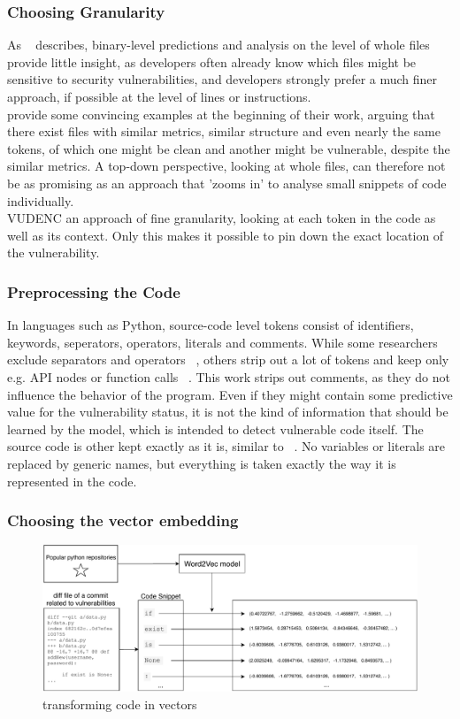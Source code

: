 \documentclass[
	a4paper,
	pagesize,
	pdftex,
	12pt,
	twoside, %
	BCOR=5mm, %
	ngerman,
	fleqn,
	final,
	]{scrartcl}
\begin{document}
\subsubsection{Choosing Granularity}
As ~\cite{Morrison.2015} describes, binary-level predictions and analysis on the level of whole files provide little insight, as developers often already know which files might be sensitive to security vulnerabilities, and developers strongly prefer a much finer approach, if possible at the level of lines or instructions.\\
\cite{Dam.2017} provide some convincing examples at the beginning of their work, arguing that there exist files with similar metrics, similar structure and even nearly the same tokens, of which one might be clean and another might be vulnerable, despite the similar metrics. A top-down perspective, looking at whole files, can therefore not be as promising as an approach that 'zooms in' to analyse small snippets of code individually.\\
VUDENC an approach of fine granularity, looking at each token in the code as well as its context. Only this makes it possible to pin down the exact location of the vulnerability. 

\subsubsection{Preprocessing the Code}
In languages such as Python, source-code level tokens consist of identifiers, keywords, seperators, operators, literals and comments. While some researchers exclude separators and operators ~\cite{Pang.2015}, others strip out a lot of tokens and keep only e.g. API nodes or function calls ~\cite{Yamaguchi.2012}. This work strips out comments, as they do not influence the behavior of the program. Even if they might contain some predictive value for the vulnerability status, it is not the kind of information that should be learned by the model, which is intended to detect vulnerable code itself. The source code is other kept exactly as it is, similar to  ~\cite{Hovsepyan.2012}. No variables or literals are replaced by generic names, but everything is taken  exactly the way it is represented in the code. 

\subsubsection{Choosing the vector embedding}
\begin{figure}[ht]
	\centering
	\includegraphics[width=\linewidth]{img/Word2Vec}
	\caption{transforming code in vectors}
	\label{fig:word2vec}
\end{figure}
\end{document}

